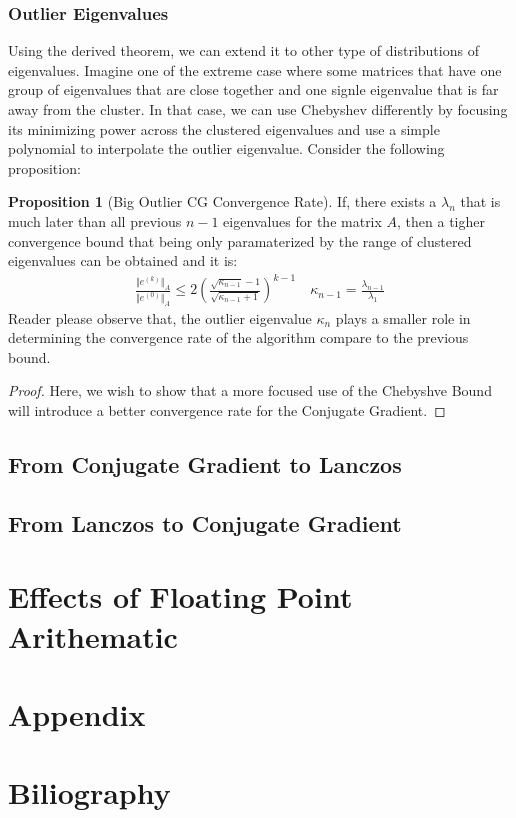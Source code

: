 \documentclass[]{article}
\theoremstyle{definition}
\newtheorem{prop}{Proposition}[section]  %
\begin{document}
        \subsubsection{Outlier Eigenvalues}
            Using the derived theorem, we can extend it to other type of distributions of eigenvalues. Imagine one of the extreme case where some matrices that have one group of eigenvalues that are close together and one signle eigenvalue that is far away from the cluster. In that case, we can use Chebyshev differently by focusing its minimizing power across the clustered eigenvalues and use a simple polynomial to interpolate the outlier eigenvalue. Consider the following proposition: 
            \begin{prop}[Big Outlier CG Convergence Rate]
                If, there exists a $\lambda_n$ that is much later than all previous $n - 1$ eigenvalues for the matrix $A$, then a tigher convergence bound that being only paramaterized by the range of clustered eigenvalues can be obtained and it is: 
                \begin{align}
                    \frac{\Vert e^{(k)}\Vert_A}{\Vert e^{(0)}\Vert_A} \le 
                    2 \left(
                        \frac{\sqrt{\kappa_{n - 1}} - 1}{\sqrt{\kappa_{n - 1} + 1}}
                    \right)^{k - 1}\quad 
                    \kappa_{n - 1} =  \frac{\lambda_{n - 1}}{\lambda_1}
                \end{align}
                Reader please observe that, the outlier eigenvalue $\kappa_n$ plays a smaller role in determining the convergence rate of the algorithm compare to the previous bound. 
            \end{prop}
            \begin{proof}
                Here, we wish to show that a more focused use of the Chebyshve Bound will introduce a better convergence rate for the Conjugate Gradient. 
            \end{proof}
            


    \subsection{From Conjugate Gradient to Lanczos}

    \subsection{From Lanczos to Conjugate Gradient}

\section{Effects of Floating Point Arithematic}
\section{Appendix}
\section{Biliography}
            
            
\end{document}
